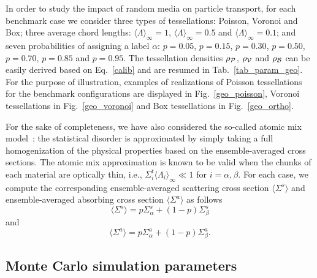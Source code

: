 \documentclass[final,authoryear,5p,times,twocolumn]{elsarticle}
\begin{document}
In order to study the impact of random media on particle transport, for each benchmark case we consider three types of tessellations: Poisson, Voronoi and Box; three average chord lengths: ${\langle \Lambda \rangle}_{\infty}=1$, ${\langle \Lambda \rangle}_{\infty}=0.5$ and ${\langle \Lambda \rangle}_{\infty}=0.1$; and seven probabilities of assigning a label $\alpha$: $p=0.05$, $p=0.15$, $p=0.30$, $p=0.50$, $p=0.70$, $p=0.85$ and $p=0.95$. The tessellation densities $\rho_{\cal P}$, $\rho_{\cal V}$ and $\rho_{\cal B}$ can be easily derived based on Eq.~\ref{calib} and are resumed in Tab.~\ref{tab_param_geo}. For the purpose of illustration, examples of realizations of Poisson tessellations for the benchmark configurations are displayed in Fig.~\ref{geo_poisson}, Voronoi tessellations in Fig.~\ref{geo_voronoi} and Box tessellations in Fig.~\ref{geo_ortho}.
 
For the sake of completeness, we have also considered the so-called atomic mix model~\cite{pomraning}: the statistical disorder is approximated by simply taking a full homogenization of the physical properties based on the ensemble-averaged cross sections. The atomic mix approximation is known to be valid when the chunks of each material are optically thin, i.e., $\Sigma_{i}^t {\langle \Lambda_{i} \rangle}_{\infty} \ll 1$ for $i=\alpha,\beta$. For each case, we compute the corresponding ensemble-averaged scattering cross section $\langle \Sigma^s\rangle $ and ensemble-averaged absorbing cross section $\langle \Sigma^a\rangle$ as follows
\begin{equation}
\langle \Sigma^s \rangle =p \Sigma_{\alpha}^s + (1-p) \Sigma_{\beta}^s
\end{equation}
and
\begin{equation}
\langle \Sigma^a \rangle =p \Sigma_{\alpha}^a + (1-p) \Sigma_{\beta}^a.
\end{equation}

\subsection{Monte Carlo simulation parameters}
\label{simulation_results}
\end{document}
